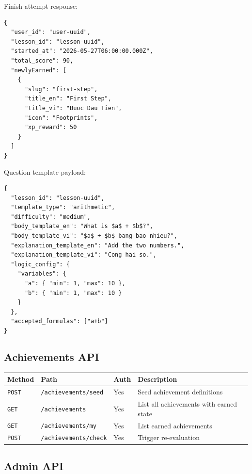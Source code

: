 \documentclass[11pt,a4paper]{article}
\newcommand{\docpath}[1]{\texttt{#1}}
\begin{document}
Finish attempt response:
\begin{lstlisting}[style=doccode]
{
  "user_id": "user-uuid",
  "lesson_id": "lesson-uuid",
  "started_at": "2026-05-27T06:00:00.000Z",
  "total_score": 90,
  "newlyEarned": [
    {
      "slug": "first-step",
      "title_en": "First Step",
      "title_vi": "Buoc Dau Tien",
      "icon": "Footprints",
      "xp_reward": 50
    }
  ]
}
\end{lstlisting}

Question template payload:
\begin{lstlisting}[style=doccode]
{
  "lesson_id": "lesson-uuid",
  "template_type": "arithmetic",
  "difficulty": "medium",
  "body_template_en": "What is $a$ + $b$?",
  "body_template_vi": "$a$ + $b$ bang bao nhieu?",
  "explanation_template_en": "Add the two numbers.",
  "explanation_template_vi": "Cong hai so.",
  "logic_config": {
    "variables": {
      "a": { "min": 1, "max": 10 },
      "b": { "min": 1, "max": 10 }
    }
  },
  "accepted_formulas": ["a+b"]
}
\end{lstlisting}

\subsection{Achievements API}

\begin{longtable}{L{0.12\textwidth}L{0.25\textwidth}L{0.12\textwidth}L{0.41\textwidth}}
\toprule
\textbf{Method} & \textbf{Path} & \textbf{Auth} & \textbf{Description} \\
\midrule
\endhead
\docpath{POST} & \docpath{/achievements/seed} & Yes & Seed achievement definitions \\
\docpath{GET} & \docpath{/achievements} & Yes & List all achievements with earned state \\
\docpath{GET} & \docpath{/achievements/my} & Yes & List earned achievements \\
\docpath{POST} & \docpath{/achievements/check} & Yes & Trigger re-evaluation \\
\bottomrule
\end{longtable}

\subsection{Admin API}
\end{document}
